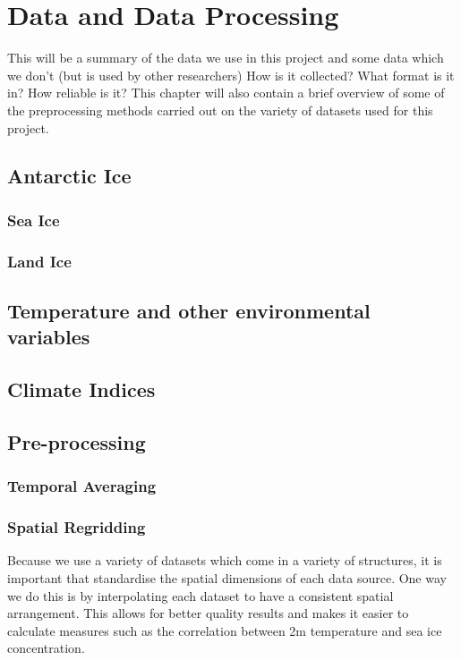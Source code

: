 \documentclass[../main.tex]{subfiles}
\begin{document}
\chapter{Data and Data Processing}
\label{chap:data}
This will be a summary of the data we use in this project and some data which we don't (but is used by other researchers)
How is it collected? What format is it in?
How reliable is it?
This chapter will also contain a brief overview of some of the preprocessing methods carried out on the variety of datasets used for this project. 

\section{Antarctic Ice}
\subsection*{Sea Ice}
\subsection*{Land Ice}

\section{Temperature and other environmental variables}

\section{Climate Indices}

\section{Pre-processing}
\subsection*{Temporal Averaging}
\subsection*{Spatial Regridding}
Because we use a variety of datasets which come in a variety of structures, it is important that standardise the spatial dimensions of each data source. One way we do this is by interpolating each dataset to have a consistent spatial arrangement. This allows for better quality results and makes it easier to calculate measures such as the correlation between 2m temperature and sea ice concentration.
\end{document}

